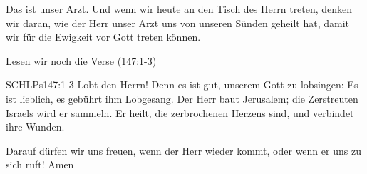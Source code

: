 \begin{otsblock}
        Das ist unser Arzt.  Und wenn wir heute an den Tisch des Herrn treten, denken wir daran, wie der Herr unser Arzt uns von unseren Sünden geheilt hat, damit wir für die Ewigkeit vor Gott treten können.

        Lesen wir noch die Verse (147:1-3)
        \begin{bibelbox}{SCHL}{Ps}{147:1-3}
        Lobt den Herrn! Denn es ist gut, unserem Gott zu lobsingen: Es ist lieblich, es gebührt ihm Lobgesang. Der Herr baut Jerusalem; die Zerstreuten Israels wird er sammeln. Er heilt, die zerbrochenen Herzens sind, und verbindet ihre Wunden.
        \end{bibelbox}
        Darauf dürfen wir uns freuen, wenn der Herr wieder kommt, oder wenn er uns zu sich ruft! Amen
    \end{otsblock}
